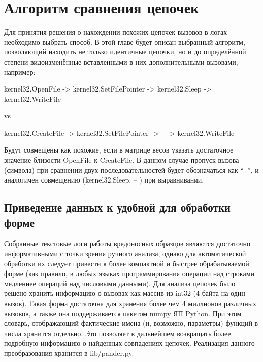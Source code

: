 \section {Алгоритм сравнения цепочек}
 Для принятия решения о нахождении похожих цепочек вызовов в логах необходимо выбрать способ. В этой главе будет описан выбранный алгоритм, позволяющий находить не только идентичные цепочки, но и до определённой степени видоизменённые вставленными в них дополнительными вызовами, например:

kernel32.OpenFile -> kernel32.SetFilePointer -> kernel32.Sleep -> kernel32.WriteFile

vs

kernel32.CreateFile -> kernel32.SetFilePointer -> --  ->   kernel32.WriteFile

Будут совмещены как похожие, если в матрице весов указать достаточное значение близости OpenFile к CreateFile.
В данном случае пропуск  вызова (символа) при сравнении двух последовательностей будет обозначаться как ``--'', и аналогичен совмещению (kernel32.Sleep, -- ) при выравнивании.
\subsection {Приведение данных к удобной для обработки форме}
Собранные текстовые логи работы вредоносных образцов являются достаточно информативными с точки зрения ручного анализа, однако для автоматической обработки их следует привести к более компактной и быстрее обрабатываемой форме (как правило, в любых языках программирования операции над строками медленнее операций над числовыми данными). Для анализа цепочек было решено хранить информацию о вызовах как массив из int32 (4 байта на один вызов). Такая форма достаточна для хранения более чем 4 миллионов различных вызовов, а также она поддерживается пакетом numpy ЯП Python. При этом словарь, отображающий фактические имена (и, возможно, параметры) функций в числа хранится отдельно. Это позволяет в дальнейшем возвращать более подробную информацию о найденных совпадениях цепочек. Реализация данного преобразования хранится в lib/pander.py.
